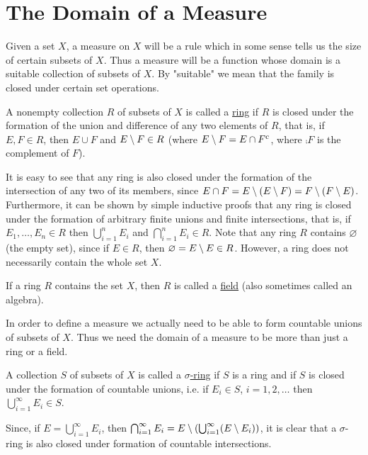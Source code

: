 


\section{The Domain of a Measure}


Given a set $X$, a measure on $X$ will be a rule which in some sense tells us the size of certain subsets of $X$. Thus a measure will be a function whose domain is a suitable collection of subsets of $X$. By "suitable" we mean that the family is closed under certain set operations.

\begin{definition}
A nonempty collection $R$ of subsets of $X$ is called a \underline{ring} if $R$ is closed under the formation of the union and difference of any two elements of $R$, that is, if $E,F\in R$, then $E\cup F$ and $E\setminus F\in R$ (where $E\setminus F = E\cap {F}^c$, where $\comp{F}$ is the complement of $F$). 
\end{definition}

It is easy to see that any ring is also closed under the formation of the intersection of any two of its members, since $E\cap F = E\setminus(E\setminus F) = F\setminus (F\setminus E)$. Furthermore, it can be shown by simple inductive proofs that any ring is closed under the formation of arbitrary finite unions and finite intersections, that is, if $E_1,\dots,E_n\in R$ then $\bigcup_{i=1}^nE_i$ and $\bigcap_{i=1}^nE_i\in R$. Note that any ring $R$ contains $\varnothing$ (the empty set), since if $E\in R$, then $\varnothing=E\setminus E\in R$. However, a ring does not necessarily contain the whole set $X$.

\begin{definition}
If a ring $R$ contains the set $X$, then $R$ is called a \underline{field} (also sometimes called an algebra).
\end{definition}

In order to define a measure we actually need to be able to form countable unions of subsets of $X$. Thus we need the domain of a measure to be more than just a ring or a field.

\begin{definition}
A collection $S$ of subsets of $X$ is called a \underline{$\sigma$-ring} if $S$ is a ring and if $S$ is closed under the formation of countable unions, i.e. if $E_i\in S$, $i=1,2,\dots$ then $\bigcup_{i=1}^\infty E_i\in S$.
\end{definition}

Since, if $E=\bigcup_{i=1}^\infty E_i$, then $\bigcap_{i=1}^\infty E_i=E\setminus\left(\bigcup_{i=1}^\infty(E\setminus E_i)\right)$, it is clear that a $\sigma$-ring is also closed under formation of countable intersections.


